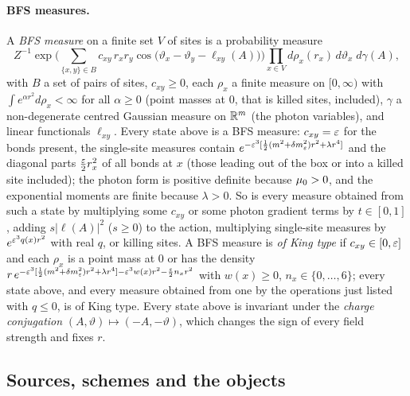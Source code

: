 \paragraph{BFS measures.} A \emph{BFS measure} on a finite set $V$ of sites is a probability measure
\[
Z^{-1}\exp\Big(\sum_{\{x,y\}\in B}c_{xy}\,r_xr_y\cos\big(\vartheta_x-\vartheta_y-\ell_{xy}(A)\big)\Big)\prod_{x\in V}d\rho_x(r_x)\,d\vartheta_x\;d\gamma(A),
\]
with $B$ a set of pairs of sites, $c_{xy}\ge0$, each $\rho_x$ a finite measure on $[0,\infty)$ with $\int e^{\alpha r^2}d\rho_x<\infty$ for all $\alpha\ge0$ (point masses at $0$, that is killed sites, included), $\gamma$ a non-degenerate centred Gaussian measure on $\mathbb R^m$ (the photon variables), and linear functionals $\ell_{xy}$. Every state above is a BFS measure: $c_{xy}=\varepsilon$ for the bonds present, the single-site measures contain $e^{-\varepsilon^3[\frac12(m^2+\delta m^2_{\varepsilon})r^2+\lambda r^4]}$ and the diagonal parts $\frac{\varepsilon}2r_x^2$ of all bonds at $x$ (those leading out of the box or into a killed site included); the photon form is positive definite because $\mu_0>0$, and the exponential moments are finite because $\lambda>0$. So is every measure obtained from such a state by multiplying some $c_{xy}$ or some photon gradient terms by $t\in[0,1]$, adding $s|\ell(A)|^2$ ($s\ge0$) to the action, multiplying single-site measures by $e^{\varepsilon^3q(x)r^2}$ with real $q$, or killing sites. A BFS measure is \emph{of King type} if $c_{xy}\in[0,\varepsilon]$ and each $\rho_x$ is a point mass at $0$ or has the density $r\,e^{-\varepsilon^3[\frac12(m^2+\delta m^2_{\varepsilon})r^2+\lambda r^4]-\varepsilon^3w(x)r^2-\frac{\varepsilon}2n_xr^2}$ with $w(x)\ge0$, $n_x\in\{0,\dots,6\}$; every state above, and every measure obtained from one by the operations just listed with $q\le0$, is of King type. Every state above is invariant under the \emph{charge conjugation} $(A,\vartheta)\mapsto(-A,-\vartheta)$, which changes the sign of every field strength and fixes $r$.

\subsection{Sources, schemes and the objects}

